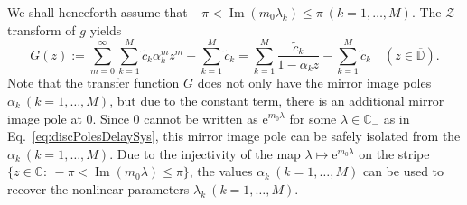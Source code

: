 \documentclass{arxiv}
\newcommand{\e}{\mathrm{e}}
\newcommand{\ri}{\mathrm{i}}
\renewcommand{\d}{\mathrm{d}}
\renewcommand{\Im}{\operatorname{Im}}
\renewcommand{\tilde}{\widetilde}
\begin{document}
We shall henceforth assume that $- \pi < \Im (m_0 \lambda_k) \le \pi \ (k=1,\ldots,M)$. 
The $\mathcal{Z}$-transform of $g$ yields
\begin{equation}
    \label{eq:Gdel}
    G(z) := \sum_{m=0}^{\infty} \sum_{k=1}^{M} \tilde{c}_k \alpha_k^m z^m - \sum_{k=1}^M \tilde{c}_k = \sum_{k=1}^{M} \frac{\tilde{c}_k}{1 - {\alpha}_k z} - \sum_{k=1}^M \tilde{c}_k \quad (z \in \overline{\mathbb{D}}).
\end{equation}
Note that the transfer function $G$ does not only have the mirror image poles $\alpha_k \ (k=1,\ldots,M)$, but due to the constant term, there is an additional mirror image pole at $0$. Since $0$ cannot be written as $\e^{m_0\lambda}$ for some $\lambda \in \mathbb{C}_-$ as in Eq.~\eqref{eq:discPolesDelaySys}, this mirror image pole can be safely isolated from the $\alpha_k \ (k=1,\ldots,M)$. 
Due to the injectivity of the map $\lambda \mapsto \e^{m_0\lambda}$ on the stripe $\{z \in \mathbb{C}: \ -\pi < \Im(m_0\lambda) \le \pi \}$, the values $\alpha_k \ (k=1,\ldots,M)$ can be used to recover the nonlinear parameters  $\lambda_k \ (k=1,\ldots,M)$. 

\end{document}
